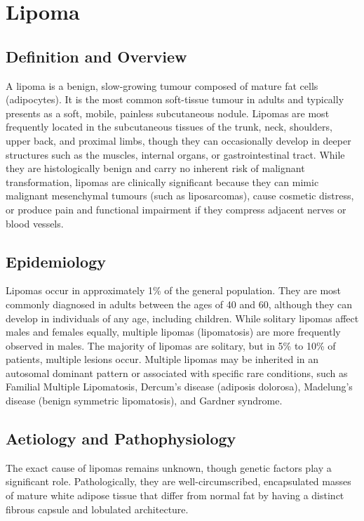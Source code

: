 \chapter{Lipoma}

\section*{Definition and Overview}
A lipoma is a benign, slow-growing tumour composed of mature fat cells (adipocytes). It is the most common soft-tissue tumour in adults and typically presents as a soft, mobile, painless subcutaneous nodule. Lipomas are most frequently located in the subcutaneous tissues of the trunk, neck, shoulders, upper back, and proximal limbs, though they can occasionally develop in deeper structures such as the muscles, internal organs, or gastrointestinal tract. While they are histologically benign and carry no inherent risk of malignant transformation, lipomas are clinically significant because they can mimic malignant mesenchymal tumours (such as liposarcomas), cause cosmetic distress, or produce pain and functional impairment if they compress adjacent nerves or blood vessels.

\section*{Epidemiology}
Lipomas occur in approximately 1\% of the general population. They are most commonly diagnosed in adults between the ages of 40 and 60, although they can develop in individuals of any age, including children. While solitary lipomas affect males and females equally, multiple lipomas (lipomatosis) are more frequently observed in males. The majority of lipomas are solitary, but in 5\% to 10\% of patients, multiple lesions occur. Multiple lipomas may be inherited in an autosomal dominant pattern or associated with specific rare conditions, such as Familial Multiple Lipomatosis, Dercum's disease (adiposis dolorosa), Madelung's disease (benign symmetric lipomatosis), and Gardner syndrome.

\section*{Aetiology and Pathophysiology}
The exact cause of lipomas remains unknown, though genetic factors play a significant role. Pathologically, they are well-circumscribed, encapsulated masses of mature white adipose tissue that differ from normal fat by having a distinct fibrous capsule and lobulated architecture.

